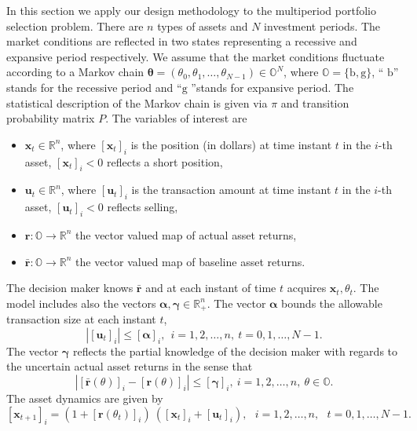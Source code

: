 \documentclass[letterpaper,11pt]{article}
\begin{document}
In this section we apply our design methodology to the  multiperiod 
portfolio selection problem.
There are $n$ types of assets and $N$ investment periods. The market conditions are reflected in two states representing a recessive and
expansive period respectively.
We assume  that the market conditions fluctuate according to a Markov chain $\bm{\theta} = (\theta_0, \theta_1, \hdots, \theta_{N-1}) \in \mathbb{O}^N$,
where $ \mathbb{O} = \{\text{b},\text{g}\}$, ``$\text{ b} $'' stands for the recessive period  and ``$\text{g}$ ''stands for expansive period.  The statistical description of the Markov chain is given via 
$\pi$  and transition probability matrix $ P$.
The variables of interest are 
\begin{itemize}
	\item $ \mathbf{x}_t \in \mathbb{R}^n$, where
	$ [ \mathbf{x}_t]_i$ is the position (in dollars) at time instant $t$ in the $i$-th asset, $ [ \mathbf{x}_t]_i <0 $ reflects a short position,
	\item $ \mathbf{u}_t \in \mathbb{R}^n$, where $ [ \mathbf{u}_t]_i$ is the transaction amount at time instant $t$ in the $i$-th asset, $ [ \mathbf{u}_t]_i <0 $ reflects selling,
	\item $ \mathbf{r} : \mathbb{O} \rightarrow \mathbb{R}^n$ the vector valued
	map of actual asset returns,
	\item$ \bar{\mathbf{r}} : \mathbb{O} \rightarrow \mathbb{R}^n$ the vector valued map of baseline asset returns.
\end{itemize}
The decision maker knows $ \bar{\mathbf{r}} $ and at each instant of time $t$
acquires  $ \mathbf{x}_t, \theta_t$. 
The model includes also the vectors $ \bm{\alpha},  \bm{\gamma} \in \mathbb{R}^n_+$.
The vector $ \bm{\alpha}$ bounds the allowable transaction size at each instant $t$, 
\begin{equation}
\label{bound_transaction}
| [\mathbf{u}_t]_i | \leq [\bm{\alpha}]_i, ~~ i =1, 2, \hdots, n,  ~t= 0,1,  \hdots, N-1.
\end{equation}
The vector $ \bm{\gamma}$ reflects the partial knowledge of the decision maker with regards to 
the uncertain actual asset returns in the sense that 
\begin{equation}
\label{bound_returns}
| [ \bar{\mathbf{r}}(\theta)]_i -  [ \mathbf{r}(\theta)]_i  |  \leq [\bm{\gamma}]_i, ~  i = 1, 2, \hdots, n, ~\theta \in \mathbb{O}.
\end{equation}
The asset dynamics are given by 
\begin{equation}
\label{asset_dynamics}
[ \mathbf{x}_{t+1}]_i = ( 1 +  [ \mathbf{r}(\theta_t)]_i ) ~  ( [\mathbf{x}_{t}]_i  + [\mathbf{u}_t ]_i ), ~~~ i = 1, 2, \hdots, n, ~~~ t= 0,1,  \hdots, N-1.
\end{equation}
\end{document}

